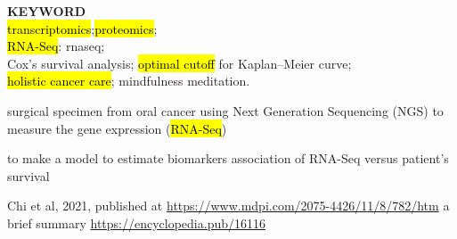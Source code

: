 \documentclass[
paper=landscape,
paper=160mm:90mm, %
fontsize=11pt, %
pagesize, %
parskip=half-, %
]{scrartcl} %
\theoremstyle{mythmstyle} %
\begin{document}
\thispagestyle{empty} %

\small\tableofcontents %


\textbf{KEYWORD}\\
\hl{transcriptomics};\hl{proteomics}; \\
\hl{RNA-Seq}: \acrlong{rnaseq};\\ %
Cox's survival analysis; \hl{optimal cutoff} for Kaplan--Meier curve; \\
\hl{holistic cancer care}; mindfulness meditation.

\begin{outline}

\1 surgical specimen from oral cancer %
\2 using Next Generation Sequencing (NGS) to measure the gene expression (\hl{RNA-Seq})

\1 to make a model to estimate biomarkers
\2 association of RNA-Seq versus patient's survival %

\1 Chi et al, 2021, published at \url{https://www.mdpi.com/2075-4426/11/8/782/htm}
\2 a brief summary
\url{https://encyclopedia.pub/16116}

\end{outline}

\clearpage


\end{document}
